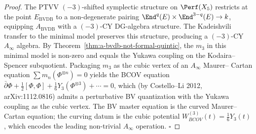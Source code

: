 \begin{proof}
The PTVV $(-3)$-shifted symplectic structure on $\Perf(X_5)$ restricts at
the point $E_{\mathrm{BVDB}}$ to a non-degenerate pairing
$\End^q(E)\times \End^{3-q}(E)\to k$, equipping $A_{\mathrm{BVDB}}$ with a
$(-3)$-CY DG-algebra structure. The Kadeishvili transfer to the minimal
model preserves this structure, producing a $(-3)$-CY $A_\infty$ algebra.
By Theorem~\ref{thm:a-bvdb-not-formal-quintic}, the $m_3$ in this minimal
model is non-zero and equals the Yukawa coupling on the Kodaira--Spencer
subquotient. Packaging $m_3$ as the cubic vertex of an $A_\infty$ Maurer--
Cartan equation $\sum m_n(\Phi^{\otimes n}) = 0$ yields the BCOV equation
$\bar\partial \Phi + \tfrac{1}{2}[\Phi,\Phi] + \tfrac{1}{6} Y_3(\Phi^{\otimes 3})
+ \cdots = 0$, which (by Costello--Li 2012, arXiv:1112.0816) admits a
perturbative BV quantization with the Yukawa coupling as the cubic vertex.
The BV master equation is the curved Maurer--Cartan equation; the
curving datum is the cubic potential $W_{BCOV}^{(3)}(t) = \tfrac{1}{6}Y_3(t)$,
which encodes the leading non-trivial $A_\infty$ operation. \hfill$\square$
\end{proof}

